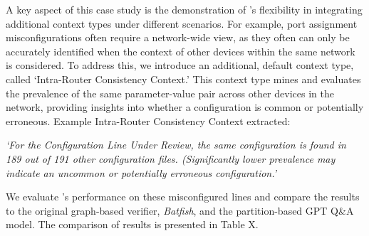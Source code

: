 A key aspect of this case study is the demonstration of \sysname{}'s flexibility in integrating additional context types under different scenarios. For example, port assignment misconfigurations often require a network-wide view, as they often can only be accurately identified when the context of other devices within the same network is considered. To address this, we introduce an additional, default context type, called `Intra-Router Consistency Context.' This context type mines and evaluates the prevalence of the same parameter-value pair across other devices in the network, providing insights into whether a configuration is common or potentially erroneous.
Example Intra-Router Consistency Context extracted:

\textit{`For the Configuration Line Under Review, the same configuration is found in 189 out of 191 other configuration files. (Significantly lower prevalence may indicate an uncommon or potentially erroneous configuration.'}

We evaluate \sysname{}'s performance on these misconfigured lines and compare the results to the original graph-based verifier, \textit{Batfish}, and the partition-based GPT Q\&A model. The comparison of results is presented in Table X.


\begin{table}[ht]
\centering
\caption{Comparison of Misconfiguration Detection Across Tools}
\end{table}


